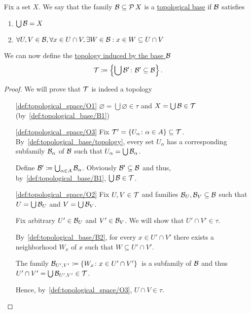 \begin{definition}\label{def:topological_base}\cite[23]{Lectures:general_topology}
  Fix a set $X$. We say that the family $\mathcal B \subseteq \operatorname{\mathcal P}{X}$ is a \uline{topological base} if $\mathcal B$ satisfies
  \begin{enumerate}[label={\textbf{B\arabic*)}}]
    \item\label{def:topological_base/B1} $\bigcup \mathcal B = X$
    \item\label{def:topological_base/B2} $\forall U, V \in \mathcal B, \forall x \in U \cap V, \exists W \in \mathcal B: x \in W \subseteq U \cap V$
  \end{enumerate}

  We can now define the \uline{topology induced by the base $\mathcal B$}
  \begin{equation}\label{def:topological_base/topology}
    \mathcal T \coloneqq \left\{ \bigcup \mathcal B' \colon \mathcal B' \subseteq \mathcal B \right\}.
  \end{equation}
\end{definition}
\begin{proof}
  We will prove that $\mathcal T$ is indeed a topology
  \begin{enumerate}
    \item[\ref{def:topological_space/O1}] $\varnothing = \bigcup \varnothing \in \tau$ and $X = \bigcup \mathcal B \in \mathcal T$ (by~\ref{def:topological_base/B1})

    \item[\ref{def:topological_space/O3}] Fix $\mathcal T' = \{ U_\alpha \colon \alpha \in A \} \subseteq \mathcal T$. By~\cref{def:topological_base/topology}, every set $U_\alpha$ has a corresponding subfamily $\mathcal B_\alpha$ of $\mathcal B$ such that $U_\alpha = \bigcup \mathcal B_\alpha$.

    Define $\mathcal B' \coloneqq \bigcup_{\alpha \in A} \mathcal B_\alpha$. Obviously $\mathcal B' \subseteq \mathcal B$ and thus, by~\ref{def:topological_base/B1}, $\bigcup \mathcal B \in \mathcal T$.

    \item[\ref{def:topological_space/O2}] Fix $U, V \in \mathcal T$ and families $\mathcal B_U, \mathcal B_V \subseteq \mathcal B$ such that $U = \bigcup \mathcal B_U$ and $V = \bigcup \mathcal B_V$.

    Fix arbitrary $U' \in \mathcal B_U$ and $V' \in \mathcal B_V$. We will show that $U' \cap V' \in \tau$.

    By~\ref{def:topological_base/B2}, for every $x \in U' \cap V'$ there exists a neighborhood $W_x$ of $x$ such that $W \subseteq U' \cap V'$.

    The family $\mathcal B_{U',V'} \coloneqq \{ W_x \colon x \in U' \cap V' \}$~\AOC is a subfamily of $\mathcal B$ and thus $U' \cap V' = \bigcup \mathcal B_{U',V'} \in \mathcal T$.

    Hence, by~\ref{def:topological_space/O3}, $U \cap V \in \tau$.
  \end{enumerate}
\end{proof}


